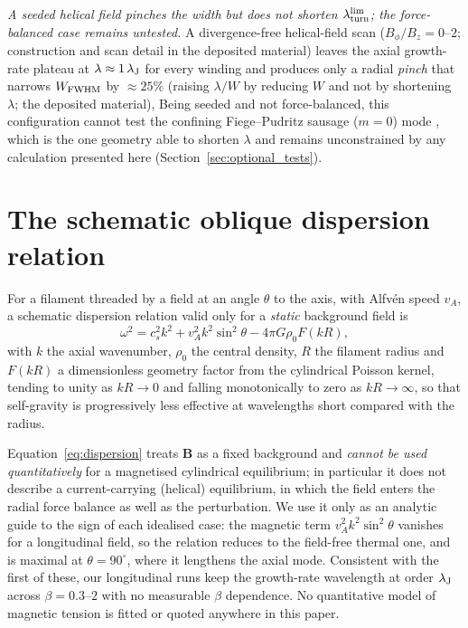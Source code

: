 \documentclass[usenatbib,twoside,twocolumn]{mnras}
\begin{document}
\emph{A seeded helical field pinches the width but does not shorten $\lambda_{\rm turn}^{\rm lim}$; the force-balanced case remains untested.} A divergence-free helical-field scan ($B_\phi/B_z=0$--$2$; construction and scan detail in the deposited material) leaves the axial growth-rate plateau at $\lambda\approx1\,\lambda_{\rm J}$ for every winding and produces only a radial \emph{pinch} that narrows $W_{\rm FWHM}$ by $\approx25\%$ (raising $\lambda/W$ by reducing $W$ and not by shortening $\lambda$; the deposited material), Being seeded and not force-balanced, this configuration cannot test the confining Fiege--Pudritz sausage ($m=0$) mode \citep{Fiege2000}, which is the one geometry able to shorten $\lambda$ and remains unconstrained by any calculation presented here (Section~\ref{sec:optional_tests}).








\section{The schematic oblique dispersion relation}
\label{sec:dispersion}

For a filament threaded by a field at an angle $\theta$ to the axis, with Alfv\'en speed $v_A$, a schematic dispersion relation valid only for a \emph{static} background field is \citep{Nakamura1993}
\begin{equation}
\omega^2 = c_s^2 k^2 + v_A^2 k^2 \sin^2\theta - 4\pi G\rho_0 F(kR),
\label{eq:dispersion}
\end{equation}
with $k$ the axial wavenumber, $\rho_0$ the central density, $R$ the filament radius and $F(kR)$ a dimensionless geometry factor from the cylindrical Poisson kernel, tending to unity as $kR\to0$ and falling monotonically to zero as $kR\to\infty$, so that self-gravity is progressively less effective at wavelengths short compared with the radius.

Equation~\ref{eq:dispersion} treats $\mathbf{B}$ as a fixed background and \emph{cannot be used quantitatively} for a magnetised cylindrical equilibrium; in particular it does not describe a current-carrying (helical) equilibrium, in which the field enters the radial force balance as well as the perturbation. We use it only as an analytic guide to the sign of each idealised case: the magnetic term $v_A^2k^2\sin^2\theta$ vanishes for a longitudinal field, so the relation reduces to the field-free thermal one, and is maximal at $\theta=90^\circ$, where it lengthens the axial mode. Consistent with the first of these, our longitudinal runs keep the growth-rate wavelength at order $\lambda_{\rm J}$ across $\beta=0.3$--$2$ with no measurable $\beta$ dependence. No quantitative model of magnetic tension is fitted or quoted anywhere in this paper.
\end{document}
